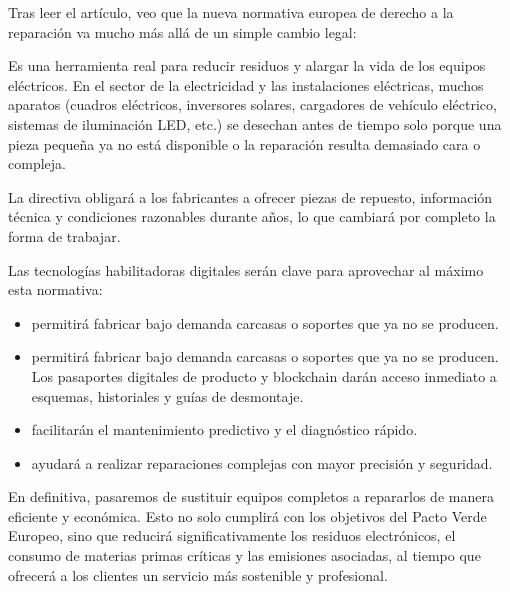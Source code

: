 \begin{solution}

Tras leer el artículo, veo que la nueva normativa europea de derecho a la reparación va mucho más allá 
de un simple cambio legal: 
\vspace{0.5em}

Es una herramienta real para reducir residuos y alargar la vida de los equipos eléctricos.
En el sector de la electricidad y las instalaciones eléctricas, muchos aparatos (cuadros eléctricos, inversores 
solares, cargadores de vehículo eléctrico, sistemas de iluminación LED, etc.) se desechan antes de tiempo solo 
porque una pieza pequeña ya no está disponible o la reparación resulta demasiado cara o compleja. 
\vspace{0.5em}

La directiva obligará a los fabricantes a ofrecer piezas de repuesto, información técnica y 
condiciones razonables durante años, lo que cambiará por completo la forma de trabajar.
\vspace{0.5em}

Las tecnologías habilitadoras digitales serán clave para aprovechar al máximo esta normativa:
\vspace{0.5em}
\begin{itemize}[label=\textbullet]
	\item{ permitirá fabricar bajo demanda carcasas o soportes que ya no se producen.}

	\item{ permitirá fabricar bajo demanda carcasas o soportes que ya no se producen.
	Los pasaportes digitales de producto y blockchain darán acceso inmediato a esquemas, historiales 
		y guías de desmontaje.}
	\item{ facilitarán el mantenimiento predictivo
		y el diagnóstico rápido.}
	\item{ ayudará a realizar reparaciones complejas con mayor 
		precisión y seguridad.}




\end{itemize}

En definitiva, pasaremos de sustituir equipos completos a repararlos de manera eficiente y económica.
Esto no solo cumplirá con los objetivos del Pacto Verde Europeo, sino que reducirá significativamente 
los residuos electrónicos, el consumo de materias primas críticas y las emisiones asociadas, al tiempo 
que ofrecerá a los clientes un servicio más sostenible y profesional. 
\end{solution}
